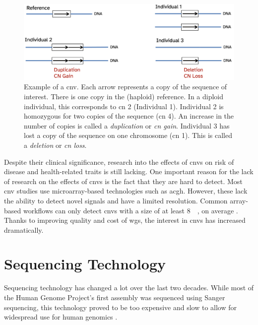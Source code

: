 \documentclass[draft]{scrbook}
\begin{document}
\begin{figure}
    \centering
    \includegraphics[width=\textwidth]{img/cnv_example.png}
    \caption{Example of a \gls{cnv}.
        Each arrow represents a copy of the sequence of interest.
        There is one copy in the (haploid) reference.
        In a diploid individual, this corresponds to \gls{cn} 2 (Individual 1).
        Individual 2 is homozygous for two copies of the sequence (\gls{cn} 4).
        An increase in the number of copies is called a \textit{duplication} or \textit{\gls{cn} gain}.
        Individual 3 has lost a copy of the sequence on one chromosome (\gls{cn} 1).
        This is called a \textit{deletion} or \textit{\gls{cn} loss}.}
        \label{fig:cnv}
\end{figure}

Despite their clinical significance, research into the effects of \glspl{cnv} on risk of disease and health-related traits is still lacking.
One important reason for the lack of research on the effects of \glspl{cnv} is the fact that they are hard to detect.
Most \gls{cnv} studies use microarray-based technologies such as \gls{acgh}.
However, these lack the ability to detect novel signals and have a limited resolution.
Common array-based workflows can only detect \glspl{cnv} with a size of at least \qty{8}{\kilo\base}, on average \cite{Quenez2020}.
Thanks to improving quality and cost of \gls{wgs}, the interest in \glspl{cnv} has increased dramatically.

\section{Sequencing Technology}
Sequencing technology has changed a lot over the last two decades.
While most of the Human Genome Project's first assembly was sequenced using Sanger sequencing, this technology proved to be too expensive and slow to allow for widespread use for human genomics \cite{Lander2001}.
\end{document}
